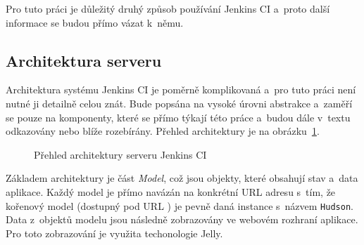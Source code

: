             Pro tuto práci je důležitý druhý způsob používání Jenkins CI a~proto další informace se budou přímo vázat k~němu.

         \subsection{Architektura serveru}   \label{secJenkinsArchitektura}
            Architektura systému Jenkins CI je poměrně komplikovaná a~pro tuto práci není nutné ji detailně celou znát.
            Bude popsána na vysoké úrovni abstrakce a~zaměří se pouze na komponenty, které se přímo týkají této práce
            a~budou dále v~textu odkazovány nebo blíže rozebírány. Přehled architektury je na obrázku~\ref{imgJenkinsArchitecture}.
       
            \begin{figure}[ht]
                \begin{center}
                    \caption{Přehled architektury serveru Jenkins CI \cite{architectureOverview}}
                    \label{imgJenkinsArchitecture}
                \end{center}
            \end{figure}     

            Základem architektury je část \emph{Model}, což jsou objekty, které obsahují stav
            a~data aplikace. Každý model je přímo navázán na konkrétní URL adresu s~tím, že kořenový
            model (dostupný pod URL \uv{/}) je pevně daná instance s~názvem \texttt{Hudson}.
            Data z~objektů modelu jsou následně zobrazovány ve webovém rozhraní aplikace.
            Pro toto zobrazování je využita techonologie Jelly.

